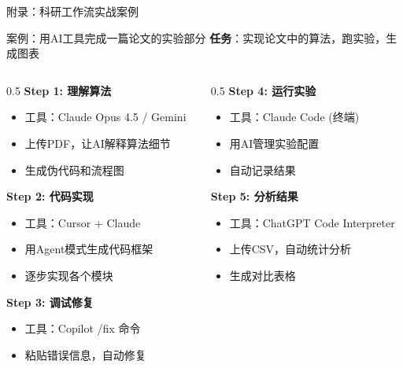 \documentclass[aspectratio=169,11pt]{beamer}
\begin{document}
\begin{frame}{附录：科研工作流实战案例}
    \begin{block}{案例：用AI工具完成一篇论文的实验部分}
        \small
        \textbf{任务}：实现论文中的算法，跑实验，生成图表
    \end{block}
    
    \begin{columns}
        \begin{column}{0.5\textwidth}
            \textbf{Step 1: 理解算法}
            \begin{itemize}
                \item 工具：Claude Opus 4.5 / Gemini
                \item 上传PDF，让AI解释算法细节
                \item 生成伪代码和流程图
            \end{itemize}
            
            \vspace{0.2cm}
            \textbf{Step 2: 代码实现}
            \begin{itemize}
                \item 工具：Cursor + Claude
                \item 用Agent模式生成代码框架
                \item 逐步实现各个模块
            \end{itemize}
            
            \vspace{0.2cm}
            \textbf{Step 3: 调试修复}
            \begin{itemize}
                \item 工具：Copilot /fix 命令
                \item 粘贴错误信息，自动修复
            \end{itemize}
        \end{column}
        \begin{column}{0.5\textwidth}
            \textbf{Step 4: 运行实验}
            \begin{itemize}
                \item 工具：Claude Code (终端)
                \item 用AI管理实验配置
                \item 自动记录结果
            \end{itemize}
            
            \vspace{0.2cm}
            \textbf{Step 5: 分析结果}
            \begin{itemize}
                \item 工具：ChatGPT Code Interpreter
                \item 上传CSV，自动统计分析
                \item 生成对比表格
            \end{itemize}
            

\end{column}
\end{columns}
\end{frame}
\end{document}
